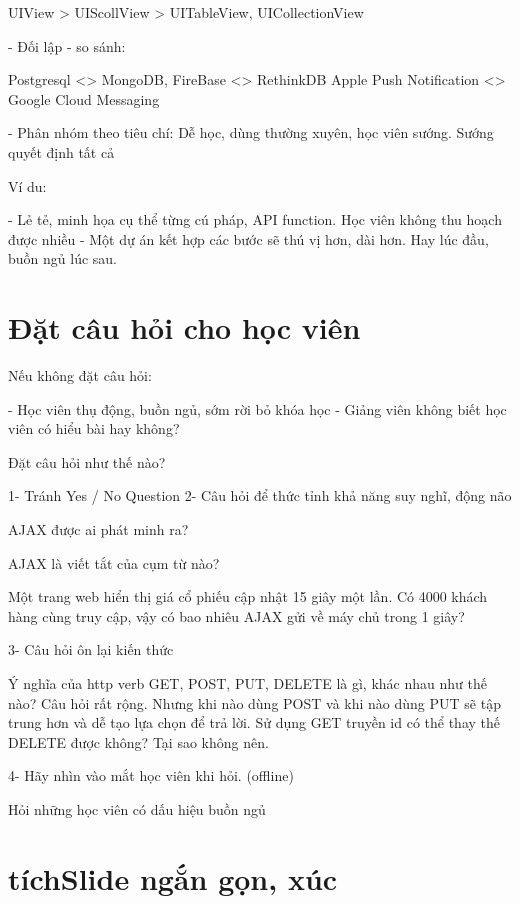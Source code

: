  UIView > UIScollView > UITableView, UICollectionView

- Đối lập - so sánh:

 Postgresql <> MongoDB, FireBase <> RethinkDB
 Apple Push Notification <> Google Cloud Messaging

- Phân nhóm theo tiêu chí: Dễ học, dùng thường xuyên, học viên sướng. Sướng quyết định tất cả

Ví du:

- Lẻ tẻ, minh họa cụ thể từng cú pháp, API function. Học viên không thu hoạch được nhiều
- Một dự án kết hợp các bước sẽ thú vị hơn, dài hơn. Hay lúc đầu, buồn ngủ lúc sau.

\section{Đặt câu hỏi cho học viên}


Nếu không đặt câu hỏi:

- Học viên thụ động, buồn ngủ, sớm rời bỏ khóa học
- Giảng viên không biết học viên có hiểu bài hay không?

Đặt câu hỏi như thế nào?

1- Tránh Yes / No Question
2- Câu hỏi để thức tỉnh khả năng suy nghĩ, động não

AJAX được ai phát minh ra?

AJAX là viết tắt của cụm từ nào?

Một trang web hiển thị giá cổ phiếu cập nhật 15 giây một lần. Có 4000 khách hàng cùng truy cập, vậy có bao nhiêu AJAX gửi về máy chủ trong 1 giây?

3- Câu hỏi ôn lại kiến thức

Ý nghĩa của http verb GET, POST, PUT, DELETE là gì, khác nhau như thế nào? Câu hỏi rất rộng.
Nhưng khi nào dùng POST và khi nào dùng PUT sẽ tập trung hơn và dễ tạo lựa chọn để trả lời.
Sử dụng GET truyền id có thể thay thế DELETE được không? Tại sao không nên.

4- Hãy nhìn vào mắt học viên khi hỏi. (offline)

Hỏi những học viên có dấu hiệu buồn ngủ

\section{tíchSlide ngắn gọn, xúc }